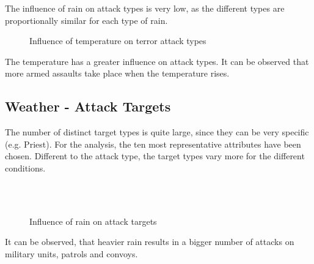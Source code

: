 The influence of rain on attack types is very low, as the different types are proportionally similar for each type of rain.

\newpage

\begin{figure}[!ht]
\centering
    \qquad
    \qquad
    \qquad
    \qquad
    \qquad
\caption{Influence of temperature on terror attack types}
\label{fig:example subfigure}
\end{figure}

The temperature has a greater influence on attack types. It can be observed that more armed assaults take place when the temperature rises.

\subsection{Weather - Attack Targets}
The number of distinct target types is quite large, since they can be very specific (e.g. Priest). For the analysis, the ten most representative attributes have been chosen. Different to the attack type, the target types vary more for the different conditions.

\begin{figure}[!ht]
\centering
    \qquad\\
    \qquad
    \qquad\\
    \qquad
\caption{Influence of rain on attack targets}
\end{figure}

It can be observed, that heavier rain results in a bigger number of attacks on military units, patrols and convoys.


